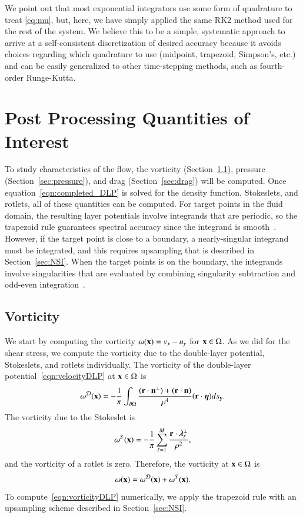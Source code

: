 \documentclass[preprint, 10pt]{elsarticle}
\begin{document}
We point out that most exponential integrators use some form of quadrature to treat \eqref{eq:mu}, but, here, we have simply applied the same RK2 method used for the rest of the system. We believe this to be a simple, systematic approach to arrive at a self-consistent discretization of desired accuracy because it avoids choices regarding which quadrature to use (midpoint, trapezoid, Simpson's, etc.) and can be easily generalized to other time-stepping methods, such as fourth-order Runge-Kutta. 


\section{Post Processing Quantities of Interest}
\label{s:qoi}
To study characteristics of the flow, the vorticity
(Section~\ref{sec:vorticity}), pressure (Section~\ref{sec:pressure}),
and drag (Section~\ref{sec:drag}) will be computed.  Once
equation~\eqref{eqn:completed_DLP} is solved for the density function,
Stokeslets, and rotlets, all of these quantities can be computed.  For
target points in the fluid domain, the resulting layer potentials
involve integrands that are periodic, so the trapezoid rule guarantees
spectral accuracy since the integrand is smooth~\cite{tre-wei2014}.
However, if the target point is close to a boundary, a nearly-singular
integrand must be integrated, and this requires upsampling that is
described in Section~\ref{sec:NSI}.  When the target points is on the
boundary, the integrands involve singularities that are evaluated by
combining singularity subtraction and odd-even
integration~\cite{sid-isr1988}.  



\subsection{Vorticity}
\label{sec:vorticity}
We start by computing the vorticity $\omega({\mathbf{x}}) = v_x - u_y$ for ${\mathbf{x}} \in
\Omega$.  As we did for the shear stress, we compute the vorticity due
to the double-layer potential, Stokeslets, and rotlets individually.
The vorticity of the double-layer potential~\eqref{eqn:velocityDLP} at
${\mathbf{x}} \in \Omega$ is
\begin{align}
  \omega^{{\mathcal{D}}}({\mathbf{x}}) = -\frac{1}{\pi}\int_{{\partial}\Omega} 
    \frac{({\mathbf{r}} \cdot {\mathbf{n}}^\perp) + ({\mathbf{r}} \cdot {\mathbf{n}})}{\rho^4}
    ({\mathbf{r}} \cdot {\boldsymbol\eta}) ds_{{\mathbf{y}}}.
  \label{eqn:vorticityDLP}
\end{align}
The vorticity due to the Stokeslet is
\begin{align*}
  \omega^S({\mathbf{x}}) = -\frac{1}{\pi} \sum_{\ell=1}^{M} 
    \frac{{\mathbf{r}} \cdot {\boldsymbol\lambda}_\ell^\perp}{\rho^2},
\end{align*}
and the vorticity of a rotlet is zero.  Therefore, the vorticity at ${\mathbf{x}}
\in \Omega$ is
\begin{align*}
  \omega({\mathbf{x}}) = \omega^{\mathcal{D}}({\mathbf{x}}) + \omega^S({\mathbf{x}}).
\end{align*}
To compute~\eqref{eqn:vorticityDLP} numerically, we apply the trapezoid
rule with an upsampling scheme described in Section~\ref{sec:NSI}.
\end{document}
